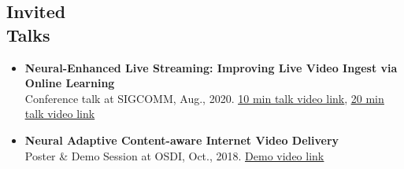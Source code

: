 \documentclass[margin,line,letter]{cv}
\newcommand{\video}[1]{\underline{\textsf{\small{#1}}}}
\begin{document}
\begin{resume}
\section{\sc Invited \\ Talks}
\begin{itemize}[leftmargin=*]
	\item{\textbf{Neural-Enhanced Live Streaming: Improving Live Video Ingest via Online Learning} \\ Conference talk at SIGCOMM, Aug., 2020. 
	\href{https://youtu.be/1giVlO6Rumg}{\video{10 min talk video link}}, \href{https://youtu.be/avkSHrXlBSA}{\video{20 min talk video link}}}
	\item{\textbf{Neural Adaptive Content-aware Internet Video Delivery} \\ Poster \& Demo Session at OSDI, Oct., 2018. 
	\href{https://youtu.be/THGMsqFOxWU}{\video{Demo video link}}}
\end{itemize}







\end{resume}
\end{document}
